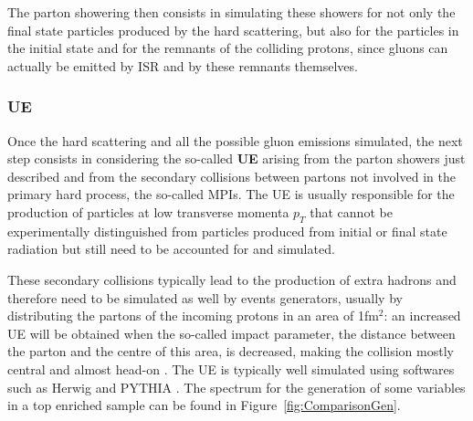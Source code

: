 \documentclass[a4paper, 10pt, openright]{report}
\begin{document}
The parton showering then consists in simulating these showers for not only the final state particles produced by the hard scattering, but also for the particles in the initial state and for the remnants of the colliding protons, since gluons can actually be emitted by \acf{ISR} and by these remnants themselves.

\subsubsection*{\acf{UE}}

Once the hard scattering and all the possible gluon emissions simulated, the next step consists in considering the so-called \textbf{\acf{UE}} arising from the parton showers just described and from the secondary collisions between partons not involved in the primary hard process, the so-called \acp{MPI}. The \ac{UE} is usually responsible for the production of particles at low transverse momenta $p_T$ that cannot be experimentally distinguished from particles produced from initial or final state radiation but still need to be accounted for and simulated.

These secondary collisions typically lead to the production of extra hadrons and therefore need to be simulated as well by events generators, usually by distributing the partons of the incoming protons in an area of 1fm$^2$: an increased \ac{UE} will be obtained when the so-called impact parameter, the distance between the parton and the centre of this area, is decreased, making the collision mostly central and almost head-on \cite{UE}. The \ac{UE} is typically well simulated using softwares such as Herwig \cite{Herwig} and PYTHIA \cite{PYTHIA}. The spectrum for the generation of some variables in a top enriched sample can be found in Figure~\ref{fig:ComparisonGen}.
\end{document}
